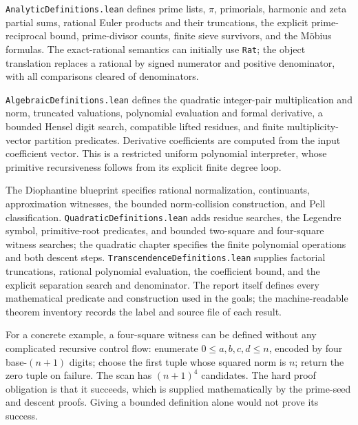 \texttt{AnalyticDefinitions.lean} defines prime lists, $\pi$, primorials, harmonic and zeta partial sums, rational Euler products and their truncations, the explicit prime-reciprocal bound, prime-divisor counts, finite sieve survivors, and the M\"obius formulas. The exact-rational semantics can initially use \texttt{Rat}; the object translation replaces a rational by signed numerator and positive denominator, with all comparisons cleared of denominators.

\texttt{AlgebraicDefinitions.lean} defines the quadratic integer-pair multiplication and norm, truncated valuations, polynomial evaluation and formal derivative, a bounded Hensel digit search, compatible lifted residues, and finite multiplicity-vector partition predicates. Derivative coefficients are computed from the input coefficient vector. This is a restricted uniform polynomial interpreter, whose primitive recursiveness follows from its explicit finite degree loop.

The Diophantine blueprint specifies rational normalization, continuants, approximation witnesses, the bounded norm-collision construction, and Pell classification. \texttt{QuadraticDefinitions.lean} adds residue searches, the Legendre symbol, primitive-root predicates, and bounded two-square and four-square witness searches; the quadratic chapter specifies the finite polynomial operations and both descent steps. \texttt{TranscendenceDefinitions.lean} supplies factorial truncations, rational polynomial evaluation, the coefficient bound, and the explicit separation search and denominator. The report itself defines every mathematical predicate and construction used in the goals; the machine-readable theorem inventory records the label and source file of each result.

For a concrete example, a four-square witness can be defined without any complicated recursive control flow: enumerate $0\le a,b,c,d\le n$, encoded by four base-$(n+1)$ digits; choose the first tuple whose squared norm is $n$; return the zero tuple on failure. The scan has $(n+1)^4$ candidates. The hard proof obligation is that it succeeds, which is supplied mathematically by the prime-seed and descent proofs. Giving a bounded definition alone would not prove its success.

